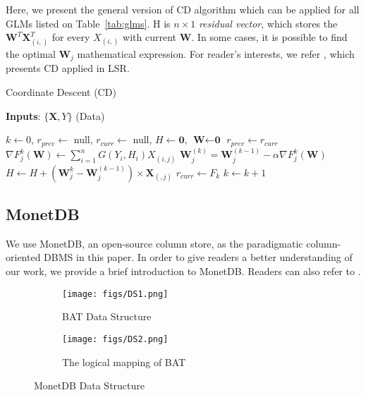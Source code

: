 \documentclass{vldb}
\begin{document}
Here, we present the general version of CD algorithm which can be applied for all GLMs listed on Table~\ref{tab:glms}. H is $n \times 1$ \textit{residual vector}, which stores the $\textbf{W}^T\textbf{X}_{(i,)}^T$ for every $X_{(i,)}$ with current \textbf{W}. In some cases, it is possible to find the optimal $\textbf{W}_j$ mathematical expression. For reader's interests, we refer \cite{CMU}, which presents CD applied in LSR.

\begin{algorithm}[t]
\caption{Coordinate Descent (CD)}
\label{alg:cd}
\textbf{Inputs}: $\{{\textbf{X}, Y}\}$ (Data)
\begin{algorithmic}[1]
\State $k \leftarrow 0$, $r_{prev} \leftarrow$ null, $r_{curr} \leftarrow$ null,  $H \leftarrow \textbf{0}$, $\textbf{W} \leftarrow \textbf{0} $
       \State $r_{prev} \leftarrow r_{curr}$
                 \State $\nabla F_{j}^{k}(\textbf{W})\leftarrow \sum_{i=1}^n{G(Y_{i}, H_i )}X_{(i,j)}$   
		\State $\textbf{W}_j^{(k)} = \textbf{W}_j^{(k-1)} - \alpha \nabla F_{j}^{k}(\textbf{W})$   
		\State $H \leftarrow H+(\textbf{W}^{k}_{j}-\textbf{W}^{(k-1)}_{j})\times \textbf{X}_{(,j)} $
	\EndFor
	\State $r_{curr} \leftarrow  F_{k}$
	\State $k \leftarrow k+1$
\EndWhile
\end{algorithmic}
\end{algorithm}

\subsection{MonetDB}
We use MonetDB, an open-source column store, as the paradigmatic column-oriented DBMS in this paper. In order to give 
readers a better understanding of our work, we provide a brief introduction to MonetDB. Readers can also refer to \cite{Boncz}.

\begin{figure}[t]
    \centering
    \begin{subfigure}[b]{0.5\textwidth}
        \centering
        \texttt{[image: figs/DS1.png]}
        \caption{BAT Data Structure}
        \label{BAT}
    \end{subfigure}
    \begin{subfigure}[b]{0.4\textwidth}
        \centering
        \texttt{[image: figs/DS2.png]}
        \caption{The logical mapping of BAT}
        \label{logical mapping}
    \end{subfigure}
    \caption{MonetDB Data Structure}
    \label{fig:ds}
\end{figure}
\end{document}
